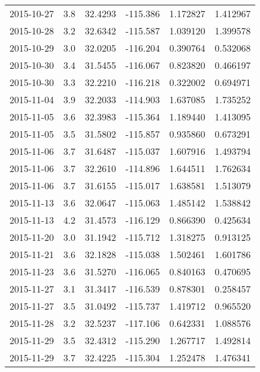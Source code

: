\begin{tabular}{lrrrrr}
2015-10-27 &       3.8 &  32.4293 &  -115.386 &         1.172827 &         1.412967 \\
2015-10-28 &       3.2 &  32.6342 &  -115.587 &         1.039120 &         1.399578 \\
2015-10-29 &       3.0 &  32.0205 &  -116.204 &         0.390764 &         0.532068 \\
2015-10-30 &       3.4 &  31.5455 &  -116.067 &         0.823820 &         0.466197 \\
2015-10-30 &       3.3 &  32.2210 &  -116.218 &         0.322002 &         0.694971 \\
2015-11-04 &       3.9 &  32.2033 &  -114.903 &         1.637085 &         1.735252 \\
2015-11-05 &       3.6 &  32.3983 &  -115.364 &         1.189440 &         1.413095 \\
2015-11-05 &       3.5 &  31.5802 &  -115.857 &         0.935860 &         0.673291 \\
2015-11-06 &       3.7 &  31.6487 &  -115.037 &         1.607916 &         1.493794 \\
2015-11-06 &       3.7 &  32.2610 &  -114.896 &         1.644511 &         1.762634 \\
2015-11-06 &       3.7 &  31.6155 &  -115.017 &         1.638581 &         1.513079 \\
2015-11-13 &       3.6 &  32.0647 &  -115.063 &         1.485142 &         1.538842 \\
2015-11-13 &       4.2 &  31.4573 &  -116.129 &         0.866390 &         0.425634 \\
2015-11-20 &       3.0 &  31.1942 &  -115.712 &         1.318275 &         0.913125 \\
2015-11-21 &       3.6 &  32.1828 &  -115.038 &         1.502461 &         1.601786 \\
2015-11-23 &       3.6 &  31.5270 &  -116.065 &         0.840163 &         0.470695 \\
2015-11-27 &       3.1 &  31.3417 &  -116.539 &         0.878301 &         0.258457 \\
2015-11-27 &       3.5 &  31.0492 &  -115.737 &         1.419712 &         0.965520 \\
2015-11-28 &       3.2 &  32.5237 &  -117.106 &         0.642331 &         1.088576 \\
2015-11-29 &       3.5 &  32.4312 &  -115.290 &         1.267717 &         1.492814 \\
2015-11-29 &       3.7 &  32.4225 &  -115.304 &         1.252478 &         1.476341 \\

\end{tabular}
